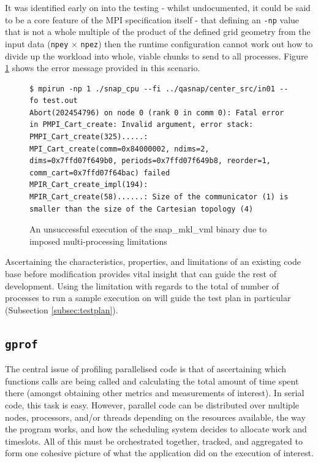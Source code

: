 \documentclass[conference]{IEEEtran}
\begin{document}
It was identified early on into the testing - whilst undocumented, it could be said to be a core feature of the MPI specification itself - that defining an \texttt{-np} value that is not a whole multiple of the product of the defined grid geometry from the input data (\texttt{npey} $ \times $ \texttt{npez}) then the runtime configuration cannot work out how to divide up the workload into whole, viable chunks to send to all processes. Figure \ref{fig:snap-unsuccessful-run} shows the error message provided in this scenario.

\begin{figure}[h]
    \centering
    \begin{lstlisting}[breaklines]
$ mpirun -np 1 ./snap_cpu --fi ../qasnap/center_src/in01 --fo test.out
Abort(202454796) on node 0 (rank 0 in comm 0): Fatal error in PMPI_Cart_create: Invalid argument, error stack:
PMPI_Cart_create(325).....: MPI_Cart_create(comm=0x84000002, ndims=2, dims=0x7ffd07f649b0, periods=0x7ffd07f649b8, reorder=1, comm_cart=0x7ffd07f64bac) failed
MPIR_Cart_create_impl(194): 
MPIR_Cart_create(58)......: Size of the communicator (1) is smaller than the size of the Cartesian topology (4)
    \end{lstlisting}
    \caption{An unsuccessful execution of the snap\_mkl\_vml binary due to imposed multi-processing limitations}
    \label{fig:snap-unsuccessful-run}
\end{figure}

Ascertaining the characteristics, properties, and limitations of an existing code base before modification provides vital insight that can guide the rest of development. Using the limitation with regards to the total of number of processes to run a sample execution on will guide the test plan in particular (Subsection \ref{subsec:testplan}).


\subsection{\texttt{gprof}}

The central issue of profiling parallelised code is that of ascertaining which functions calls are being called and calculating the total amount of time spent there (amongst obtaining other metrics and measurements of interest). In serial code, this task is easy. However, parallel code can be distributed over multiple nodes, processors, and/or threads depending on the resources available, the way the program works, and how the scheduling system decides to allocate work and timeslots. All of this must be orchestrated together, tracked, and aggregated to form one cohesive picture of what the application did on the execution of interest.
\end{document}
